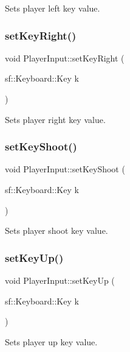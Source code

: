 Sets player left key value. \hypertarget{classPlayerInput_a5f09a7c77ae9c20f8246be5eda9856b8}{}\label{classPlayerInput_a5f09a7c77ae9c20f8246be5eda9856b8} 
\subsubsection{\texorpdfstring{set\+Key\+Right()}{setKeyRight()}}
{\footnotesize\ttfamily void Player\+Input\+::set\+Key\+Right (\begin{DoxyParamCaption}\item[{sf\+::\+Keyboard\+::\+Key}]{k }\end{DoxyParamCaption})}

Sets player right key value. \hypertarget{classPlayerInput_aeae833b00ec51fb096811a828b4b6e9b}{}\label{classPlayerInput_aeae833b00ec51fb096811a828b4b6e9b} 
\subsubsection{\texorpdfstring{set\+Key\+Shoot()}{setKeyShoot()}}
{\footnotesize\ttfamily void Player\+Input\+::set\+Key\+Shoot (\begin{DoxyParamCaption}\item[{sf\+::\+Keyboard\+::\+Key}]{k }\end{DoxyParamCaption})}

Sets player shoot key value. \hypertarget{classPlayerInput_ac28c127fd9a00d9983061057548e8d6b}{}\label{classPlayerInput_ac28c127fd9a00d9983061057548e8d6b} 
\subsubsection{\texorpdfstring{set\+Key\+Up()}{setKeyUp()}}
{\footnotesize\ttfamily void Player\+Input\+::set\+Key\+Up (\begin{DoxyParamCaption}\item[{sf\+::\+Keyboard\+::\+Key}]{k }\end{DoxyParamCaption})}

Sets player up key value. \hypertarget{classPlayerInput_a5acff106260290af275b0559f8f72dd9}{}\label{classPlayerInput_a5acff106260290af275b0559f8f72dd9} 
